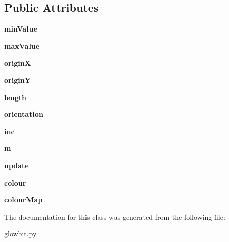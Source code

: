 \subsection*{Public Attributes}
\begin{DoxyCompactItemize}
\item 
\mbox{\label{classglowbit_1_1glowbitMatrix_1_1graph1D_aa3d020bb8aa07dfb208582b045fc0c27}} 
{\bfseries min\+Value}
\item 
\mbox{\label{classglowbit_1_1glowbitMatrix_1_1graph1D_ab4d267a5d54ee085f3d9730111793dee}} 
{\bfseries max\+Value}
\item 
\mbox{\label{classglowbit_1_1glowbitMatrix_1_1graph1D_abe80fa374ef4be3d221174f6184c5ae4}} 
{\bfseries originX}
\item 
\mbox{\label{classglowbit_1_1glowbitMatrix_1_1graph1D_aa72de1eb6177af6f741c2e298bd890f6}} 
{\bfseries originY}
\item 
\mbox{\label{classglowbit_1_1glowbitMatrix_1_1graph1D_a1b650cb2675d638268381e8a07fe6533}} 
{\bfseries length}
\item 
\mbox{\label{classglowbit_1_1glowbitMatrix_1_1graph1D_acd0f6e12bc30ce6f111cb6eaae9ef24e}} 
{\bfseries orientation}
\item 
\mbox{\label{classglowbit_1_1glowbitMatrix_1_1graph1D_ac1cf85cc860f1d5fedf7decb523bdc99}} 
{\bfseries inc}
\item 
\mbox{\label{classglowbit_1_1glowbitMatrix_1_1graph1D_a041638afbf547fa602f5f9c0a32a04ac}} 
{\bfseries m}
\item 
\mbox{\label{classglowbit_1_1glowbitMatrix_1_1graph1D_af5324fa1a0151bd176b2b1981b795dcd}} 
{\bfseries update}
\item 
\mbox{\label{classglowbit_1_1glowbitMatrix_1_1graph1D_aef599f3d1afc77e3b0228c8b6a7dfa1c}} 
{\bfseries colour}
\item 
\mbox{\label{classglowbit_1_1glowbitMatrix_1_1graph1D_aabbb79560f8c4907bfd1669274c7b2eb}} 
{\bfseries colour\+Map}
\end{DoxyCompactItemize}


The documentation for this class was generated from the following file\+:\begin{DoxyCompactItemize}
\item 
glowbit.\+py\end{DoxyCompactItemize}
